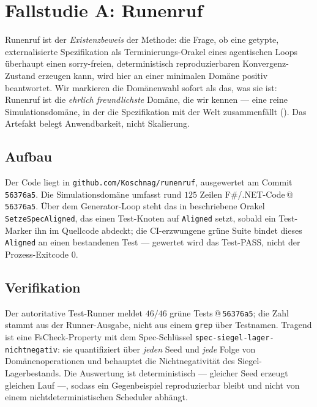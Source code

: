 \documentclass[11pt,a4paper]{article}
\theoremstyle{definition}
\theoremstyle{remark}
\begin{document}
\section{Fallstudie A: Runenruf}
\label{sec:runenruf}

Runenruf ist der \emph{Existenzbeweis} der Methode: die Frage, ob eine getypte,
externalisierte Spezifikation als Terminierungs-Orakel eines agentischen Loops überhaupt
einen sorry-freien, deterministisch reproduzierbaren Konvergenz-Zustand erzeugen kann, wird
hier an einer minimalen Domäne positiv beantwortet. Wir markieren die Domänenwahl sofort als
das, was sie ist: Runenruf ist die \emph{ehrlich freundlichste} Domäne, die wir kennen --- eine
reine Simulationsdomäne, in der die Spezifikation mit der Welt zusammenfällt
(). Das Artefakt belegt Anwendbarkeit, nicht Skalierung.

\subsection{Aufbau}
\label{sec:runenruf-aufbau}

Der Code liegt in \texttt{github.com/Koschnag/runenruf}, ausgewertet am Commit
\texttt{56376a5}. Die Simulationsdomäne umfasst rund $125$ Zeilen
F\#/.NET-Code\,@\,\texttt{56376a5}. Über dem Generator-Loop steht das in
 beschriebene Orakel \texttt{SetzeSpecAligned},
das einen Test-Knoten auf \texttt{Aligned} setzt, sobald ein Test-Marker ihn im
Quellcode abdeckt; die CI-erzwungene grüne Suite bindet dieses \texttt{Aligned} an einen
bestandenen Test --- gewertet wird das Test-PASS, nicht der Prozess-Exitcode $0$.

\subsection{Verifikation}
\label{sec:runenruf-verifikation}

Der autoritative Test-Runner meldet $46/46$ grüne Tests\,@\,\texttt{56376a5}; die Zahl stammt
aus der Runner-Ausgabe, nicht aus einem \texttt{grep} über Testnamen. Tragend ist eine
FsCheck-Property mit dem Spec-Schlüssel \texttt{spec-siegel-lager-nichtnegativ}: sie
quantifiziert über \emph{jeden} Seed und \emph{jede} Folge von Domänenoperationen und behauptet
die Nichtnegativität des Siegel-Lagerbestands. Die Auswertung ist deterministisch --- gleicher
Seed erzeugt gleichen Lauf ---, sodass ein Gegenbeispiel reproduzierbar bleibt und nicht von
einem nichtdeterministischen Scheduler abhängt.
\end{document}
